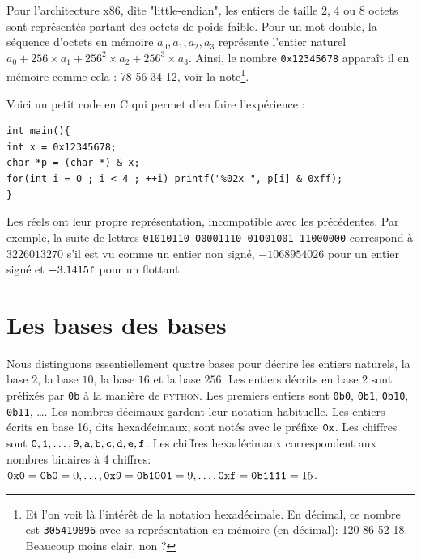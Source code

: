 \documentclass{book}
\newcommand{\python}{\textsc{python}\xspace}
\newcommand{\C}{\textsc{C}\xspace}
\newcommand{\code}[1]{\texttt{#1}}
\newcommand{\hexa}[1]{{\tt 0x#1}}
\newcommand{\bina}[1]{{\tt 0b#1}}
\begin{document}
Pour l'architecture {\sc x86}, dite "little-endian", les entiers de taille 2, 4 ou 8 octets sont représentés partant des octets de poids faible. Pour un mot double, la séquence d'octets en mémoire $a_0, a_1, a_2, a_3$ représente l'entier naturel $a_0 + 256 \times a_1 + 256^2 \times a_2 + 256^3 \times a_3$. Ainsi, le nombre \code{0x12345678} apparaît il en mémoire comme cela : 
78 56 34 12, voir la note\footnote{Et l'on voit là l'intérêt de la notation hexadécimale. En décimal, ce nombre est \code{305419896} avec sa représentation en mémoire (en décimal): 120 86 52 18. Beaucoup moins clair, non ? }.

Voici un petit code en \C qui permet d'en faire l'expérience :
\begin{verbatim}
int main(){
int x = 0x12345678;
char *p = (char *) & x;
for(int i = 0 ; i < 4 ; ++i) printf("%02x ", p[i] & 0xff);
}
\end{verbatim}

Les réels ont leur propre représentation, incompatible avec les précédentes. Par exemple, la suite de lettres {\tt 01010110\ 00001110\ 01001001\ 11000000} correspond à  $3226013270$ s'il est vu comme un entier non signé, $-1068954026$ pour un entier signé et  $-3.1415{\tt f}$ pour un flottant. 


\section{Les bases des bases}

Nous distinguons essentiellement quatre bases pour décrire les entiers naturels, la base $2$, la base $10$, la base $16$ et la base $256$. Les entiers décrits en base $2$ sont préfixés par {\tt 0b} à la manière de \python. Les premiers entiers sont {\bina{0}, \bina{1}, \bina{10}, \bina{11}, \ldots}.  Les nombres décimaux gardent leur notation habituelle.  Les entiers écrits en base 16, dits hexadécimaux, sont notés avec le préfixe $\tt 0x$. Les chiffres sont $\tt 0, 1, \ldots, 9, a, b, c, d, e, f$. Les chiffres hexadécimaux correspondent aux nombres binaires à 4 chiffres: $\hexa{0} = \bina{0} = 0, \ldots, \hexa{9} = \bina{1001} = 9, \ldots, \hexa{f} = \bina{1111} = 15$. 
\end{document}
